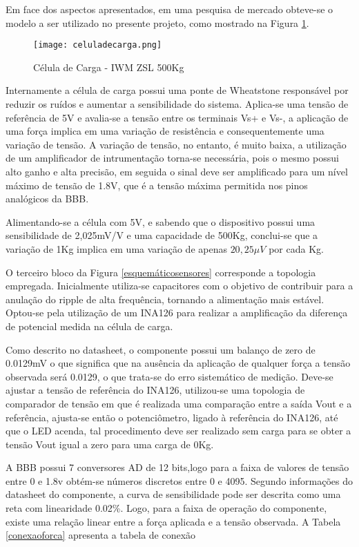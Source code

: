 		Em face dos aspectos apresentados, em uma pesquisa de mercado obteve-se o modelo a ser utilizado no presente projeto, como mostrado na Figura \ref{celuladecarga}.
	
	\newpage	
	\begin{figure}[!h]
		\centering
		\texttt{[image: celuladecarga.png]}
		\caption{Célula de Carga - IWM ZSL 500Kg}
		\label{celuladecarga}
	\end{figure}

	Internamente a célula de carga possui uma ponte de Wheatstone responsável por reduzir os ruídos e aumentar a sensibilidade do sistema. Aplica-se uma tensão de referência de 5V e avalia-se a tensão entre os terminais Vs+ e Vs-, a aplicação de uma força implica em uma variação de resistência e consequentemente uma variação de tensão. A variação de tensão, no entanto, é muito baixa, a utilização de um amplificador de intrumentação torna-se necessária, pois o mesmo possui alto ganho e alta precisão, em seguida o sinal deve ser amplificado para um nível máximo de tensão de 1.8V,  que é a tensão máxima permitida nos pinos analógicos da BBB.

	Alimentando-se a célula com 5V, e sabendo que o dispositivo possui uma sensibilidade de 2,025mV/V e uma capacidade de 500Kg, conclui-se que a variação de 1Kg implica em uma variação de apenas $20,25\mu V$ por cada Kg. 

	 O terceiro bloco da Figura \ref{esquemáticosensores} corresponde a topologia empregada. Inicialmente utiliza-se capacitores com o objetivo de contribuir para a anulação do ripple de alta frequência, tornando a alimentação mais estável. Optou-se pela utilização de um INA126 para realizar a amplificação da diferença de potencial medida na célula de carga. 

	Como descrito no datasheet, o componente possui um balanço de zero de 0.0129mV o que significa que na ausência da aplicação de qualquer força a tensão observada será 0.0129, o que trata-se do erro sistemático de medição. Deve-se ajustar a tensão de referência do INA126, utilizou-se uma topologia de comparador de tensão em que é realizada uma comparação entre a saída Vout e a referência, ajusta-se então o potenciômetro, ligado à referência do INA126, até que o LED acenda, tal procedimento deve ser realizado sem carga para se obter a tensão Vout igual a zero para uma carga de 0Kg.

	A BBB possui 7 conversores AD de 12 bits,logo para a faixa de valores de tensão entre 0 e 1.8v obtém-se números discretos entre 0 e 4095. Segundo informações do datasheet do componente, a curva de sensibilidade pode ser descrita como uma reta com linearidade 0.02\%. Logo, para a faixa de operação do componente, existe uma relação linear entre a força aplicada e a tensão observada. A Tabela \ref{conexaoforca} apresenta a tabela de conexão 

